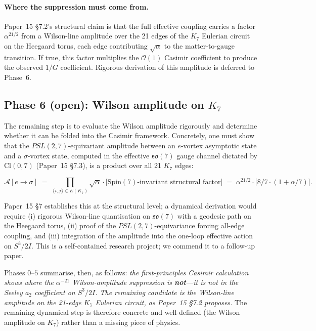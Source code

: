 \documentclass[11pt]{article}
\begin{document}
\paragraph{Where the suppression must come from.}
Paper~15 \S7.2's structural claim is that the full effective
coupling carries a factor $\alpha^{21/2}$ from a Wilson-line
amplitude over the 21 edges of the $K_7$ Eulerian circuit on the
Heegaard torus, each edge contributing $\sqrt{\alpha}$ to the
matter-to-gauge transition.  If true, this factor multiplies the
$\mathcal{O}(1)$ Casimir coefficient to produce the observed
$1/G$ coefficient.  Rigorous derivation of this amplitude is
deferred to Phase~6.

\subsection{Phase 6 (open): Wilson amplitude on $K_7$}

The remaining step is to evaluate the Wilson amplitude rigorously
and determine whether it can be folded into the Casimir framework.
Concretely, one must show that the $PSL(2,7)$-equivariant amplitude
between an $e$-vortex asymptotic state and a $\sigma$-vortex state,
computed in the effective $\mathfrak{so}(7)$ gauge channel dictated
by $\mathrm{Cl}(0,7)$ (Paper~15 \S7.3), is a product over all 21
$K_7$ edges:

\begin{equation}
  \mathcal{A}[e \to \sigma]
  \;=\; \prod_{\{i,j\} \in E(K_7)} \sqrt{\alpha}
   \cdot \bigl[\text{Spin}(7)\text{-invariant structural factor}\bigr]
  \;=\; \alpha^{21/2} \cdot \bigl[8/7 \cdot (1{+}\alpha/7)\bigr] .
\end{equation}

Paper~15 \S7 establishes this at the structural level; a dynamical
derivation would require (i) rigorous Wilson-line quantisation on
$\mathfrak{so}(7)$ with a geodesic path on the Heegaard torus,
(ii) proof of the $PSL(2,7)$-equivariance forcing all-edge coupling,
and (iii) integration of the amplitude into the one-loop effective
action on $S^3/2I$.  This is a self-contained research project;
we commend it to a follow-up paper.

Phases $0$--$5$ summarise, then, as follows: \emph{the
first-principles Casimir calculation shows where the $\alpha^{-21}$
Wilson-amplitude suppression is \textbf{not}---it is not in the
Seeley $a_2$ coefficient on $S^3/2I$.  The remaining candidate
is the Wilson-line amplitude on the 21-edge $K_7$ Eulerian
circuit, as Paper~15 \S7.2 proposes.}  The remaining dynamical
step is therefore concrete and well-defined (the Wilson amplitude
on $K_7$) rather than a missing piece of physics.
\end{document}

